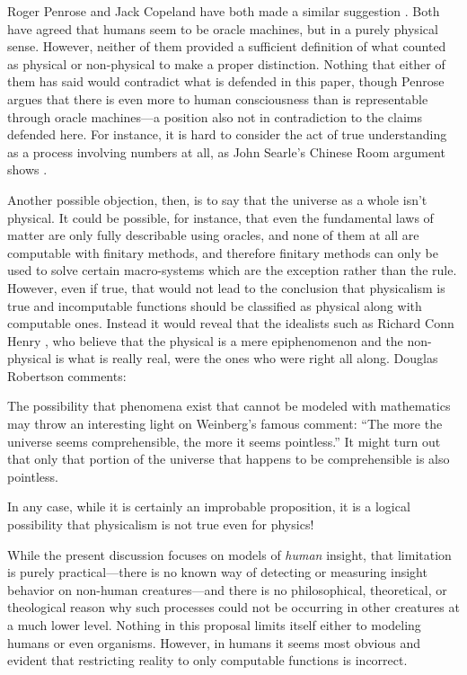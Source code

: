 Roger Penrose and Jack Copeland have both made a similar suggestion \citep{copeland1998, hodges2000}.  Both have agreed that humans seem to be oracle machines, but in a purely physical sense.  However, neither of them provided a sufficient definition of what counted as physical or non-physical to make a proper distinction.  Nothing that either of them has said would contradict what is defended in this paper, though Penrose argues that there is even more to human consciousness than is representable through oracle machines---a position also not in contradiction to the claims defended here.   For instance, it is hard to consider the act of true understanding as a process involving numbers at all, as John Searle's Chinese Room argument shows \citep{searle1980}.

Another possible objection, then, is to say that the universe as a whole isn't physical.  It could be possible, for instance, that even the fundamental laws of matter are only fully describable using oracles, and none of them at all are computable with finitary methods, and therefore finitary methods can only be used to solve certain macro-systems which are the exception rather than the rule.  However, even if true, that would not lead to the conclusion that physicalism is true and incomputable functions should be classified as physical along with computable ones.  Instead it would reveal that the idealists such as Richard Conn Henry \citeyearpar{henry2005}, who believe that the physical is a mere epiphenomenon and the non-physical is what is really real, were the ones who were right all along.  Douglas Robertson \citeyearpar{robertson1999} comments:

\begin{quoting}
The possibility that phenomena exist that cannot be modeled with mathematics may throw an interesting light on Weinberg's famous comment: ``The more the universe seems comprehensible, the more it seems pointless.'' It might turn out that only that portion of the universe that happens to be comprehensible is also pointless.
\end{quoting}

In any case, while it is certainly an improbable proposition, it is a logical possibility that physicalism is not true even for physics!  

While the present discussion focuses on models of \textit{human} insight, that limitation is purely practical---there is no known way of detecting or measuring insight behavior on non-human creatures---and there is no philosophical, theoretical, or theological reason why such processes could not be occurring in other creatures at a much lower level.  Nothing in this proposal limits itself either to modeling humans or even organisms.  However, in humans it seems most obvious and evident that restricting reality to only computable functions is incorrect.

